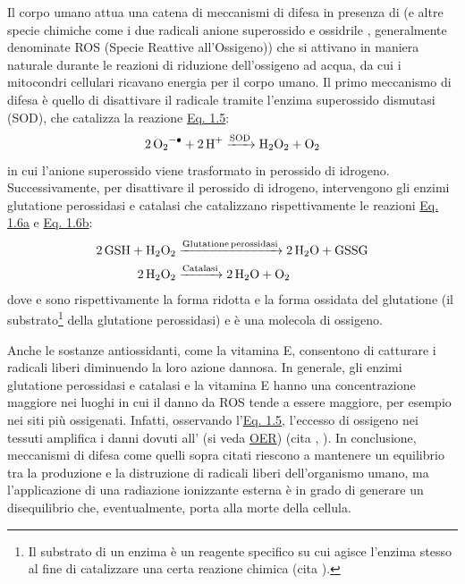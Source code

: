 \documentclass[12pt,a4paper,twoside]{report}
\begin{document}
	Il corpo umano attua una catena di meccanismi di difesa in presenza di  (e altre specie chimiche come i due radicali anione superossido  e ossidrile , generalmente denominate ROS (Specie Reattive all'Ossigeno)) che si attivano in maniera naturale durante le reazioni di riduzione dell'ossigeno ad acqua, da cui i mitocondri cellulari ricavano energia per il corpo umano. Il primo meccanismo di difesa è quello di disattivare il radicale  tramite l'enzima superossido dismutasi (SOD), che catalizza la reazione \hyperref[eq:sod]{Eq. 1.5}:
	\begin{equation}
		\ce{2O2^{-.} + 2H^+ ->[SOD] H2O2 + O2}
		\label{eq:sod}
	\end{equation}
	in cui l'anione superossido viene trasformato in perossido di idrogeno. Successivamente, per disattivare il perossido di idrogeno, intervengono gli enzimi glutatione perossidasi e catalasi che catalizzano rispettivamente le reazioni \hyperref[eq:gsh]{Eq. 1.6a} e \hyperref[eq:catalasi]{Eq. 1.6b}:
	\begin{subequations}
		\begin{align}
			\label{eq:gsh}
			\ce{2GSH + H2O2 &->[Glutatione perossidasi] 2H2O + GSSG}\\
			\label{eq:catalasi}
			\ce{2H2O2 &->[Catalasi] 2H2O + O2}
		\end{align}
	\end{subequations}
	dove  e  sono rispettivamente la forma ridotta e la forma ossidata del glutatione (il substrato\footnote{Il substrato di un enzima è un reagente specifico su cui agisce l'enzima stesso al fine di catalizzare una certa reazione chimica (cita
		).} della glutatione perossidasi) e  è una molecola di ossigeno.
	
	Anche le sostanze antiossidanti, come la vitamina E, consentono di catturare i radicali liberi diminuendo la loro azione dannosa. In generale, gli enzimi glutatione perossidasi e catalasi e la vitamina E hanno una concentrazione maggiore nei luoghi in cui il danno da ROS tende a essere maggiore, per esempio nei siti più ossigenati. Infatti, osservando l'\hyperref[eq:sod]{Eq. 1.5}, l'eccesso di ossigeno nei tessuti amplifica i danni dovuti all' (si veda \hyperref[par:oer]{OER}) (cita
	,
	). In conclusione, meccanismi di difesa come quelli sopra citati riescono a mantenere un equilibrio tra la produzione e la distruzione di radicali liberi dell'organismo umano, ma l'applicazione di una radiazione ionizzante esterna è in grado di generare un disequilibrio che, eventualmente, porta alla morte della cellula.
	
\end{document}
